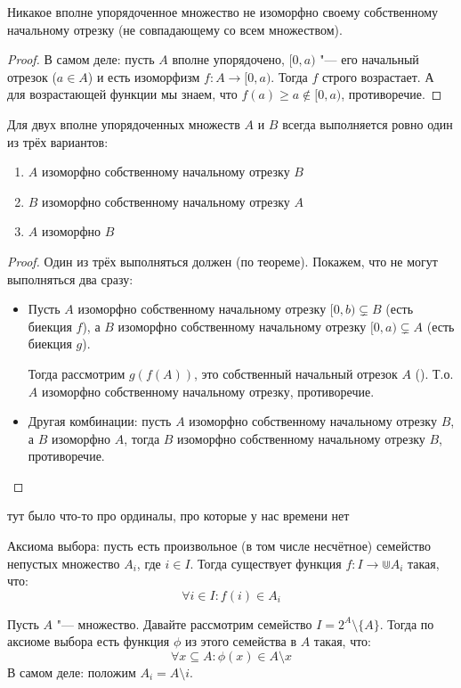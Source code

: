 \begin{lemma}
	Никакое вполне упорядоченное множество не изоморфно своему собственному начальному отрезку (не совпадающему со всем множеством).
\end{lemma}
\begin{proof}
	В самом деле: пусть $A$ вполне упорядочено, $[0, a)$ "--- его начальный отрезок ($a \in A$)
	и есть изоморфизм $f \colon A \to [0, a)$.
	Тогда $f$ строго возрастает.
	А для возрастающей функции мы знаем, что $f(a) \ge a \notin [0, a)$, противоречие.
\end{proof}
\begin{conseq}
	Для двух вполне упорядоченных множеств $A$ и $B$ всегда выполняется ровно один из трёх вариантов:
	\begin{enumerate}
		\item $A$ изоморфно собственному начальному отрезку $B$
		\item $B$ изоморфно собственному начальному отрезку $A$
		\item $A$ изоморфно $B$
	\end{enumerate}
\end{conseq}
\begin{proof}
	Один из трёх выполняться должен (по теореме).
	Покажем, что не могут выполняться два сразу:
	\begin{itemize}
		\item
			Пусть $A$ изоморфно собственному начальному отрезку $[0, b) \subsetneq B$ (есть биекция $f$),
			а $B$ изоморфно собственному начальному отрезку $[0, a) \subsetneq A$ (есть биекция $g$).

			Тогда рассмотрим $g(f(A))$, это собственный начальный отрезок $A$
			(\TODO).
			Т.о. $A$ изоморфно собственному начальному отрезку, противоречие.

		\item
			Другая комбинации: пусть $A$ изоморфно собственному начальному отрезку $B$,
			а $B$ изоморфно $A$, тогда $B$ изоморфно собственному начальному отрезку $B$,
			противоречие.
	\end{itemize}
\end{proof}

\TODO тут было что-то про ординалы, про которые у нас времени нет

\begin{Def}
	Аксиома выбора: пусть есть произвольное (в том числе несчётное) семейство
	непустых множество $A_i$, где $i \in I$.
	Тогда существует функция $f \colon I \to \Cup A_i$ такая, что:
	\[ \forall i \in I \colon f(i) \in A_i \]
\end{Def}
\begin{conseq}\label{axiom_of_choice_phi}
	Пусть $A$ "--- множество.
	Давайте рассмотрим семейство $I=2^A \setminus \{A \}$.
	Тогда по аксиоме выбора есть функция $\phi$ из этого семейства в $A$ такая, что:
	\[ \forall x \subseteq A \colon \phi(x) \in A \setminus x \]
	В самом деле: положим $A_i = A \setminus i$.
\end{conseq}

